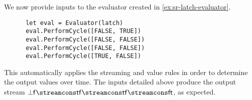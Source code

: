\begin{example}
    We now provide inputs to the evaluator created in
    \cref{ex:sr-latch-evaluator}.
    \begin{lstlisting}
      let eval = Evaluator(latch)
      eval.PerformCycle([FALSE, TRUE])
      eval.PerformCycle([FALSE, FALSE])
      eval.PerformCycle([FALSE, FALSE])
      eval.PerformCycle([TRUE, FALSE])
    \end{lstlisting}
    This automatically applies the streaming and value rules in order to
    determine the output values over time.
    The inputs detailed above produce the output stream \(
    \bot\mathsf{f} \streamcons \mathsf{t}\mathsf{f} \streamcons
    \mathsf{t}\mathsf{f} \streamcons \mathsf{f}\mathsf{t}
    \), as expected.
    \begin{center}
        \scalebox{0.225}{}
    \end{center}
\end{example}